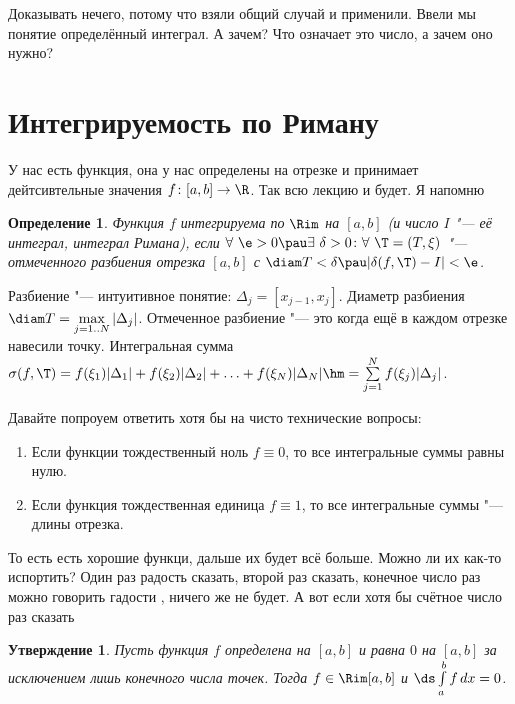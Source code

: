 \documentclass[a4paper,10pt,twoside]{article}
\newtheorem{Def}{Определение}[section]
\newtheorem{Ut}{Утверждение}[section]
\let\AVsection\section{}
\renewcommand\section{\newpage\scol\AVsection}
\newcommand{\scol}{  \renewcommand{\headrulewidth}{0.5pt}\fancyhead[RE,LO]{\thesection{} \leftmark} \fancyhead[LE,RO]{\thepage}}
\begin{document}
 Доказывать нечего, потому что взяли общий случай и применили. Ввели мы понятие определённый интеграл. А зачем? Что означает это число, а зачем оно нужно?
 
 
 
 \section{Интегрируемость по Риману}
 У нас есть функция, она у нас определены на отрезке и принимает дейтсивтельные значения $f\colon[a,b]\to\R$. 
 Так всю лекцию и будет. Я напомню
 
 \begin{Def}
 	Функция $f$ интегрируема по $\Rim$ на $[a,b]$ (и число $I$ "--- её интеграл, интеграл Римана), если
 	$\forall\  \e>0\pau \exists\ \delta>0\colon\forall\ \T=(T,\xi)$ "--- отмеченного разбиения отрезка $[a,b]$ с
 	$\diam T<\delta\pau |\delta(f,\T)-I|<\e$.
 \end{Def}
 
 Разбиение "--- интуитивное понятие: $\Delta_j=[x_{j-1},x_j]$. Диаметр разбиения $\diam T=\max\limits_{j=1..N}|\Delta_j|$. Отмеченное разбиение
 "--- это когда ещё в каждом отрезке навесили точку. Интегральная сумма $\sigma(f,\T)=f(\xi_1)|\Delta_1|+f(\xi_2)|\Delta_2|+\ldots+f(\xi_N)|\Delta_N|\hm=
 \sum\limits_{j=1}^Nf(\xi_j)|\Delta_j|$.
 
 Давайте попроуем ответить хотя бы на чисто технические вопросы:
 
 \begin{enumerate}
   \item Если функции тождественный ноль $f\equiv0$, то все интегральные суммы равны нулю.
   \item Если функция тождественная единица $f\equiv1$, то все интегральные суммы "--- длины отрезка.
 \end{enumerate}
 
 То есть есть хорошие функци, дальше их будет всё больше. Можно ли их как-то испортить? Один раз радость сказать, второй раз сказать, конечное число раз
 можно говорить гадости , ничего же не будет. А вот если хотя бы счётное число раз сказать\ldotst{}
 
 \begin{Ut}
 	Пусть функция $f$ определена на $[a,b]$ и равна $0$ на $[a,b]$ за исключением лишь конечного числа точек.
 	Тогда $f\in\Rim[a,b]$ и $\ds\int\limits_a^bf\,dx=0$.
 \end{Ut}
 
\end{document}
